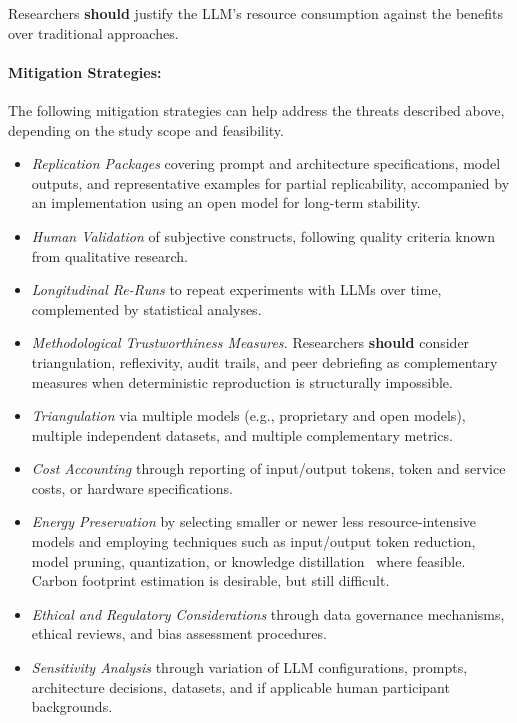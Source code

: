 \documentclass[smallextended]{svjour3}
\newcommand{\should}{\textbf{should}\xspace}
\begin{document}
Researchers \should justify the LLM's resource consumption against the benefits over traditional approaches.

\paragraph{Mitigation Strategies:}
The following mitigation strategies can help address the threats described above, depending on the study scope and feasibility.

\begin{itemize}
    \item \emph{Replication Packages} covering prompt and architecture specifications, model outputs, and representative examples for partial replicability, accompanied by an implementation using an open model for long-term stability.
    \item \emph{Human Validation} of subjective constructs, following quality criteria known from qualitative research.
    \item \emph{Longitudinal Re-Runs} to repeat experiments with LLMs over time, complemented by statistical analyses.
    \item \emph{Methodological Trustworthiness Measures.} Researchers \should consider triangulation, reflexivity, audit trails, and peer debriefing as complementary measures when deterministic reproduction is structurally impossible.
    \item \emph{Triangulation} via multiple models (e.g., proprietary and open models), multiple independent datasets, and multiple complementary metrics.
    \item \emph{Cost Accounting} through reporting of input/output tokens, token and service costs, or hardware specifications.
    \item \emph{Energy Preservation} by selecting smaller or newer less resource-intensive models and employing techniques such as input/output token reduction, model pruning, quantization, or knowledge distillation~\cite{mitu2024hidden} where feasible. Carbon footprint estimation is desirable, but still difficult.
    \item \emph{Ethical and Regulatory Considerations} through data governance mechanisms, ethical reviews, and bias assessment procedures.
    \item \emph{Sensitivity Analysis} through variation of LLM configurations, prompts, architecture decisions, datasets, and if applicable human participant backgrounds.
\end{itemize}
\end{document}
